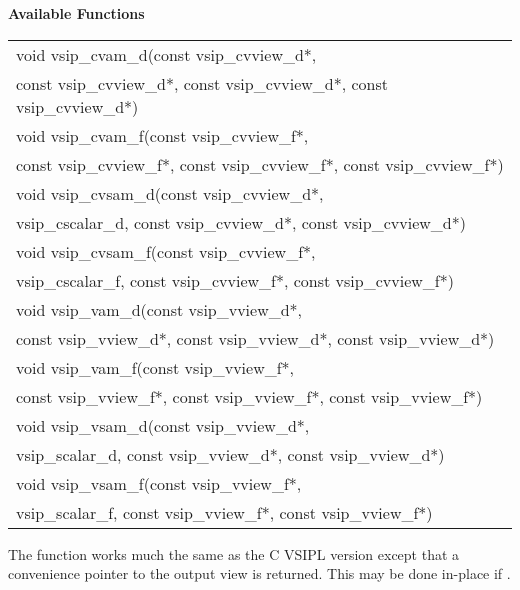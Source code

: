 \cvsiplh
\newline \hspace*{.8cm} \vspace*{.1cm} \textbf{Available Functions }
\newline \hspace*{1.1cm} {
\ttfamily
\begin{tabular}[H]{l}
void vsip\_cvam\_d(const vsip\_cvview\_d*,\\*\hspace{.7cm}const vsip\_cvview\_d*, const vsip\_cvview\_d*, const vsip\_cvview\_d*)\\
void vsip\_cvam\_f(const vsip\_cvview\_f*,\\*\hspace{.7cm}const vsip\_cvview\_f*, const vsip\_cvview\_f*, const vsip\_cvview\_f*)\\
void vsip\_cvsam\_d(const vsip\_cvview\_d*,\\*\hspace{.7cm}vsip\_cscalar\_d, const vsip\_cvview\_d*, const vsip\_cvview\_d*)\\
void vsip\_cvsam\_f(const vsip\_cvview\_f*,\\*\hspace{.7cm}vsip\_cscalar\_f, const vsip\_cvview\_f*, const vsip\_cvview\_f*)\\
void vsip\_vam\_d(const vsip\_vview\_d*,\\*\hspace{.7cm}const vsip\_vview\_d*, const vsip\_vview\_d*, const vsip\_vview\_d*)\\
void vsip\_vam\_f(const vsip\_vview\_f*,\\*\hspace{.7cm}const vsip\_vview\_f*, const vsip\_vview\_f*, const vsip\_vview\_f*)\\
void vsip\_vsam\_d(const vsip\_vview\_d*,\\*\hspace{.7cm}vsip\_scalar\_d, const vsip\_vview\_d*, const vsip\_vview\_d*)\\
void vsip\_vsam\_f(const vsip\_vview\_f*,\\*\hspace{.7cm}vsip\_scalar\_f, const vsip\_vview\_f*, const vsip\_vview\_f*)\\
\end{tabular}
}
\pyjvsiph
{}
\newline\hspace*{1.2cm}\parbox{10.8cm}{\vspace*{.1cm}The  function works much the same as the C VSIPL version except that a convenience pointer to the output view is returned. This may be done in-place if .}